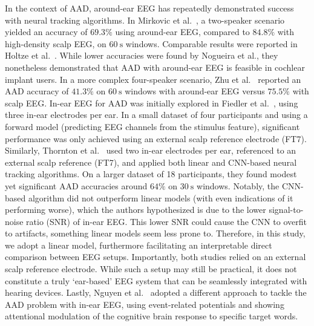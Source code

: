 \documentclass[fleqn,10pt]{wlscirep}
\begin{document}
	In the context of AAD, around-ear EEG has repeatedly demonstrated success with neural tracking algorithms. In Mirkovic et al.~\cite{mirkovic2016target}, a two-speaker scenario yielded an accuracy of $69.3\%$ using around-ear EEG, compared to $84.8\%$ with high-density scalp EEG, on $\SI{60}{\second}$ windows. Comparable results were reported in Holtze et al.~\cite{holtze2022ear}. While lower accuracies were found by Nogueira et al.\cite{nogueira2019decoding}, they nonetheless demonstrated that AAD with around-ear EEG is feasible in cochlear implant users. In a more complex four-speaker scenario, Zhu et al.~\cite{zhu2025using} reported an AAD accuracy of $41.3\%$ on $\SI{60}{\second}$ windows with around-ear EEG versus $75.5\%$ with scalp EEG. In-ear EEG for AAD was initially explored in Fiedler et al.~\cite{fiedler2017single}, using three in-ear electrodes per ear. In a small dataset of four participants and using a forward model (predicting EEG channels from the stimulus feature), significant performance was only achieved using an external scalp reference electrode (FT7). Similarly, Thornton et al.~\cite{thornton2024comparison} used two in-ear electrodes per ear, referenced to an external scalp reference (FT7), and applied both linear and CNN-based neural tracking algorithms. On a larger dataset of 18 participants, they found modest yet significant AAD accuracies around $64\%$ on $\SI{30}{\second}$ windows. Notably, the CNN-based algorithm did not outperform linear models (with even indications of it performing worse), which the authors hypothesized is due to the lower signal-to-noise ratio (SNR) of in-ear EEG. This lower SNR could cause the CNN to overfit to artifacts, something linear models seem less prone to. Therefore, in this study, we adopt a linear model, furthermore facilitating an interpretable direct comparison between EEG setups. Importantly, both studies relied on an external scalp reference electrode. While such a setup may still be practical, it does not constitute a truly `ear-based' EEG system that can be seamlessly integrated with hearing devices. Lastly, Nguyen et al.~\cite{nguyen2025cognitive} adopted a different approach to tackle the AAD problem with in-ear EEG, using event-related potentials and showing attentional modulation of the cognitive brain response to specific target words.
	
\end{document}
